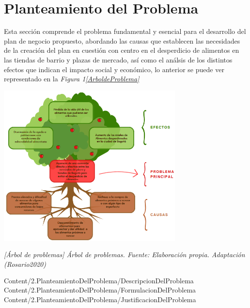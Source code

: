\section{Planteamiento del Problema}

Esta sección comprende el problema fundamental  y esencial para el desarrollo del plan de negocio propuesto, abordando las causas que establecen las necesidades de la creación del plan en cuestión con centro en el desperdicio de alimentos en las tiendas de barrio y plazas de mercado, así como el análsis de los distintos efectos que indican el impacto social y económico, lo anterior se puede ver representado en la \textit{Figura 1\ref{ArboldeProblema}}

\vspace{5mm}
\begin{minipage}{0.9\textwidth}
\centering
\label{ArboldeProblema}
\includegraphics[width=0.7\textwidth]{Images/ArboldeProblema.png}
\end{minipage}
\textit{[{Árbol de problemas}]{ Árbol de problemas. Fuente: Elaboración propia. Adaptación (Rosario2020) }}



{Content/2.PlanteamientoDelProblema/DescripcionDelProblema}
{Content/2.PlanteamientoDelProblema/FormulacionDelProblema}
{Content/2.PlanteamientoDelProblema/JustificacionDelProblema}